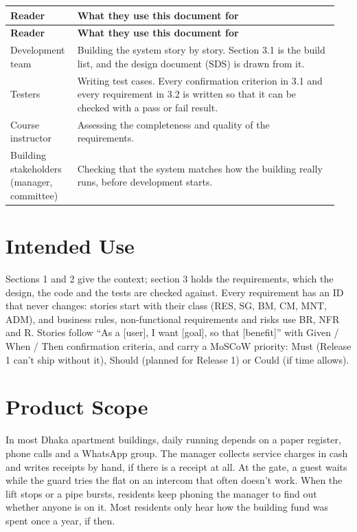 \documentclass[11pt,a4paper]{report}
\begin{document}
{\setlength{\LTpre}{6pt}\setlength{\LTpost}{6pt}
\begin{longtable}{>{\raggedright\arraybackslash}p{0.187\linewidth}>{\raggedright\arraybackslash}p{0.763\linewidth}}
\toprule
\textbf{Reader} & \textbf{What they use this document for} \\
\midrule
\endfirsthead
\toprule
\textbf{Reader} & \textbf{What they use this document for} \\
\midrule
\endhead
\bottomrule
\endlastfoot
Development team & Building the system story by story. Section 3.1 is the build list, and the design document (SDS) is drawn from it. \\
Testers & Writing test cases. Every confirmation criterion in 3.1 and every requirement in 3.2 is written so that it can be checked with a pass or fail result. \\
Course instructor & Assessing the completeness and quality of the requirements. \\
Building stakeholders (manager, committee) & Checking that the system matches how the building really runs, before development starts. \\
\end{longtable}
}

\section{Intended Use}

Sections 1 and 2 give the context; section 3 holds the requirements, which the design, the code and the tests are checked against. Every requirement has an ID that never changes: stories start with their class (RES, SG, BM, CM, MNT, ADM), and business rules, non-functional requirements and risks use BR, NFR and R. Stories follow ``As a [user], I want [goal], so that [benefit]'' with Given / When / Then confirmation criteria, and carry a MoSCoW priority: Must (Release 1 can't ship without it), Should (planned for Release 1) or Could (if time allows).

\section{Product Scope}

In most Dhaka apartment buildings, daily running depends on a paper register, phone calls and a WhatsApp group. The manager collects service charges in cash and writes receipts by hand, if there is a receipt at all. At the gate, a guest waits while the guard tries the flat on an intercom that often doesn't work. When the lift stops or a pipe bursts, residents keep phoning the manager to find out whether anyone is on it. Most residents only hear how the building fund was spent once a year, if then.
\end{document}

